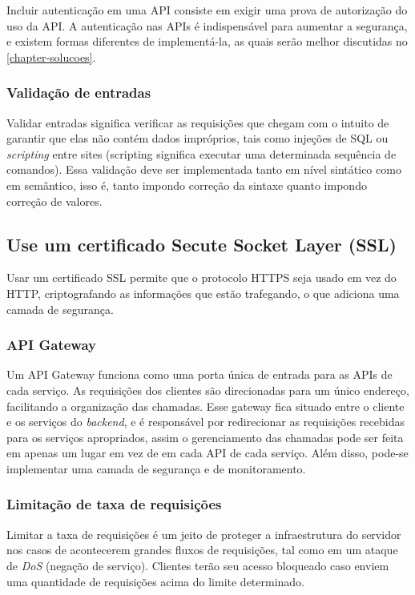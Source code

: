 Incluir autenticação em uma API consiste em exigir uma prova de autorização do uso da API. A autenticação nas APIs é indispensável para aumentar a segurança, e existem formas diferentes de implementá-la, as quais serão melhor discutidas no \autoref{chapter-solucoes}.

\subsubsection*{Validação de entradas}

Validar entradas significa verificar as requisições que chegam com o intuito de garantir que elas não contém dados impróprios, tais como injeções de SQL ou \emph{scripting} entre sites (scripting significa executar uma determinada sequência de comandos). Essa validação deve ser implementada tanto em nível sintático como em semântico, isso é, tanto impondo correção da sintaxe quanto impondo correção de valores. \cite{rapidAPI-twitter}

\subsection*{Use um certificado Secute Socket Layer (SSL)}
Usar um certificado SSL permite que o protocolo HTTPS seja usado em vez do HTTP, criptografando as informações que estão trafegando, o que adiciona uma camada de segurança. \cite{rapidAPI-twitter}

\subsubsection*{API Gateway}
Um API Gateway funciona como uma porta única de entrada para as APIs de cada serviço. As requisições dos clientes são direcionadas para um único endereço, facilitando a organização das chamadas. Esse gateway fica situado entre o cliente e os serviços do \emph{backend}, e é responsável por redirecionar as requisições recebidas para os serviços apropriados, assim o gerenciamento das chamadas pode ser feita em apenas um lugar em vez de em cada API de cada serviço. Além disso, pode-se implementar uma camada de segurança e de monitoramento. \cite{rapidAPI-twitter}

\subsubsection*{Limitação de taxa de requisições}
Limitar a taxa de requisições é um jeito de proteger a infraestrutura do servidor nos casos de acontecerem grandes fluxos de requisições, tal como em um ataque de \emph{DoS} (negação de serviço). Clientes terão seu acesso bloqueado caso enviem uma quantidade de requisições acima do limite determinado. \cite{rapidAPI-twitter}

